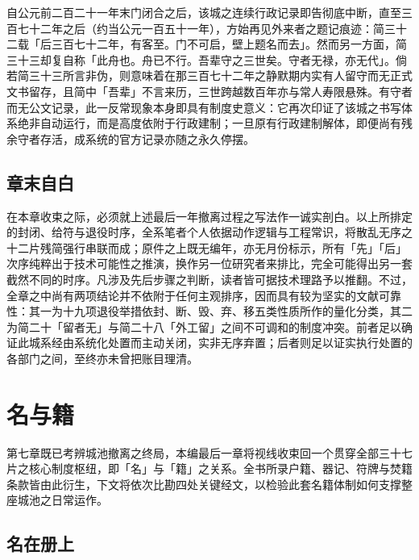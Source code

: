 自公元前二百二十一年末门闭合之后，该城之连续行政记录即告彻底中断，直至三百七十二年之后（约当公元一百五十一年），方始再见外来者之题记痕迹：简三十二载「后三百七十二年，有客至。门不可启，壁上题名而去」。然而另一方面，简三十三却复自称「此舟也。舟已不行。吾辈守之三世矣。守者无禄，亦无代」。倘若简三十三所言非伪，则意味着在那三百七十二年之静默期内实有人留守而无正式文书留存，且简中「吾辈」不言来历，三世跨越数百年亦与常人寿限悬殊。有守者而无公文记录，此一反常现象本身即具有制度史意义：它再次印证了该城之书写体系绝非自动运行，而是高度依附于行政建制；一旦原有行政建制解体，即便尚有残余守者存活，成系统的官方记录亦随之永久停摆。

\section{章末自白}

在本章收束之际，必须就上述最后一年撤离过程之写法作一诚实剖白。以上所排定的封闭、给符与退役时序，全系笔者个人依据动作逻辑与工程常识，将散乱无序之十二片残简强行串联而成；原件之上既无编年，亦无月份标示，所有「先」「后」次序纯粹出于技术可能性之推演，换作另一位研究者来排比，完全可能得出另一套截然不同的时序。凡涉及先后步骤之判断，读者皆可据技术理路予以推翻。不过，全章之中尚有两项结论并不依附于任何主观排序，因而具有较为坚实的文献可靠性：其一为十九项退役举措依封、断、毁、弃、移五类性质所作的量化分类，其二为简二十「留者无」与简二十八「外工留」之间不可调和的制度冲突。前者足以确证此城系经由系统化处置而主动关闭，实非无序弃置；后者则足以证实执行处置的各部门之间，至终亦未曾把账目理清。

\chapter{名与籍}

第七章既已考辨城池撤离之终局，本编最后一章将视线收束回一个贯穿全部三十七片之核心制度枢纽，即「名」与「籍」之关系。全书所录户籍、器记、符牌与焚籍条款皆由此衍生，下文将依次比勘四处关键经文，以检验此套名籍体制如何支撑整座城池之日常运作。

\section{名在册上}

